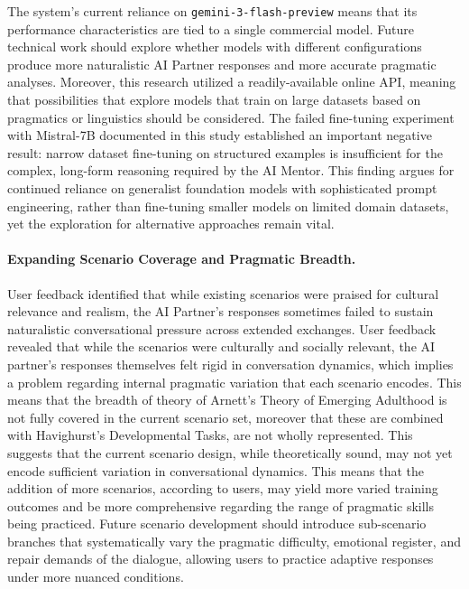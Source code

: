 The system's current reliance on \texttt{gemini-3-flash-preview} means that its
performance characteristics are tied to a single commercial model. Future technical
work should explore whether models with different configurations
produce more naturalistic AI Partner responses and more accurate
pragmatic analyses. Moreover, this research utilized a readily-available online API, meaning
that possibilities that explore models that train on large datasets based on pragmatics or linguistics
should be considered. The failed fine-tuning experiment with Mistral-7B documented
in this study established an important negative result: narrow dataset fine-tuning
on structured examples is insufficient for the complex, long-form reasoning
required by the AI Mentor. This finding argues for continued reliance on
generalist foundation models with sophisticated prompt engineering, rather than
fine-tuning smaller models on limited domain datasets, yet the exploration for alternative
approaches remain vital.


\paragraph{Expanding Scenario Coverage and Pragmatic Breadth.}

User feedback identified that while existing scenarios were praised for cultural
relevance and realism, the AI Partner's responses sometimes failed to sustain
naturalistic conversational pressure across extended exchanges. User feedback revealed that while 
the scenarios were culturally and socially relevant, the AI partner's responses themselves 
felt rigid in conversation dynamics, which implies a problem regarding internal pragmatic variation
that each scenario encodes. This means that the breadth of theory of Arnett's Theory of Emerging Adulthood is not
fully covered in the current scenario set, moreover that these are combined with Havighurst's Developmental Tasks,
are not wholly represented. This suggests that the current scenario design, while theoretically sound, may not yet encode
sufficient variation in conversational dynamics. This means that the addition of more scenarios, according to users,
may yield more varied training outcomes and be more comprehensive regarding the range 
of pragmatic skills being practiced. Future scenario development should introduce
sub-scenario branches that systematically vary the pragmatic difficulty, emotional
register, and repair demands of the dialogue, allowing users to practice adaptive
responses under more nuanced conditions.

